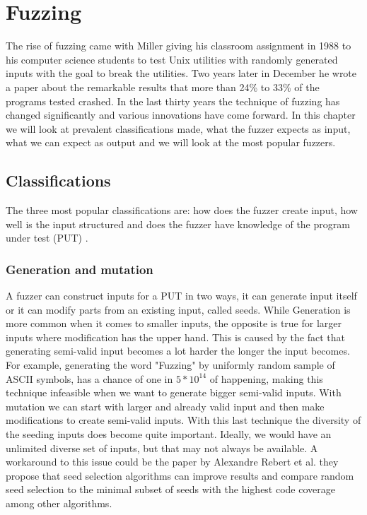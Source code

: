 \chapter{Fuzzing}
\label{cha:2:fuzzing}
\label{fuzzing:intro}
The rise of fuzzing came with Miller giving his classroom assignment \cite{21FuzzingAssignment} in 1988 to his computer science students to test Unix utilities with randomly generated inputs with the goal to break the utilities. Two years later in December he wrote a paper \cite{4originalFuzzingUnixUtils} about the remarkable results that more than 24\% to 33\% of the programs tested crashed.
In the last thirty years the technique of fuzzing has changed significantly and various innovations have come forward. In this chapter we will look at prevalent classifications made, what the fuzzer expects as input, what we can expect as output and we will look at the most popular fuzzers.

\section{Classifications}
\label{fuzzing:Classifications}
The three most popular classifications are: how does the fuzzer create input, how well is the input structured and does the fuzzer have knowledge of the program under test (PUT) \cite{30FuzzingHackartandscience, 12Fuzzingasurvey, 13manes2019survey}.

\subsection{Generation and mutation}
\label{fuzzing:generationMutation}
A fuzzer can construct inputs for a PUT in two ways, it can generate input itself or it can modify parts from an existing input, called seeds. While Generation is more common when it comes to smaller inputs, the opposite is true for larger inputs where modification has the upper hand. This is caused by the fact that generating semi-valid input becomes a lot harder the longer the input becomes. For example, generating the word "Fuzzing" by uniformly random sample of ASCII symbols, has a chance of one in $5*10^{14}$ of happening, making this technique infeasible when we want to generate bigger semi-valid inputs. With mutation we can start with larger and already valid input and then make modifications to create semi-valid inputs. With this last technique the diversity of the seeding inputs does become quite important. Ideally, we would have an unlimited diverse set of inputs, but that may not always be available. A workaround to this issue could be the paper by Alexandre Rebert et al. \cite{14rebert2014seedselecting} they propose that seed selection algorithms can improve results and compare random seed selection to the minimal subset of seeds with the highest code coverage among other algorithms. 

